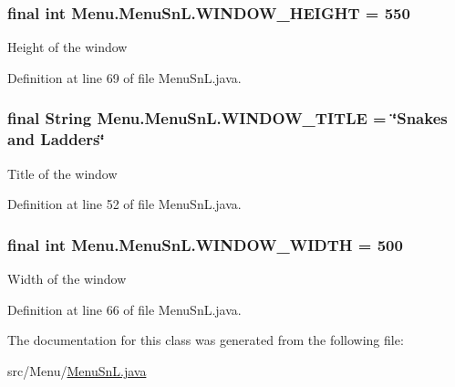 \subsubsection[{W\+I\+N\+D\+O\+W\+\_\+\+H\+E\+I\+G\+H\+T}]{\setlength{\rightskip}{0pt plus 5cm}final int Menu.\+Menu\+Sn\+L.\+W\+I\+N\+D\+O\+W\+\_\+\+H\+E\+I\+G\+H\+T = 550\hspace{0.3cm}{\ttfamily [private]}}\label{class_menu_1_1_menu_sn_l_a32c2e05c64b453df29d8b6df1061a939}
Height of the window 

Definition at line 69 of file Menu\+Sn\+L.\+java.

\hypertarget{class_menu_1_1_menu_sn_l_a62bbb19bbedcdf63b575b4ae1048c343}{}
\subsubsection[{W\+I\+N\+D\+O\+W\+\_\+\+T\+I\+T\+L\+E}]{\setlength{\rightskip}{0pt plus 5cm}final String Menu.\+Menu\+Sn\+L.\+W\+I\+N\+D\+O\+W\+\_\+\+T\+I\+T\+L\+E = \char`\"{}Snakes and Ladders\char`\"{}\hspace{0.3cm}{\ttfamily [private]}}\label{class_menu_1_1_menu_sn_l_a62bbb19bbedcdf63b575b4ae1048c343}
Title of the window 

Definition at line 52 of file Menu\+Sn\+L.\+java.

\hypertarget{class_menu_1_1_menu_sn_l_a2fcacd6fe04ce3a540d0d100ca57b993}{}
\subsubsection[{W\+I\+N\+D\+O\+W\+\_\+\+W\+I\+D\+T\+H}]{\setlength{\rightskip}{0pt plus 5cm}final int Menu.\+Menu\+Sn\+L.\+W\+I\+N\+D\+O\+W\+\_\+\+W\+I\+D\+T\+H = 500\hspace{0.3cm}{\ttfamily [private]}}\label{class_menu_1_1_menu_sn_l_a2fcacd6fe04ce3a540d0d100ca57b993}
Width of the window 

Definition at line 66 of file Menu\+Sn\+L.\+java.



The documentation for this class was generated from the following file\+:\begin{DoxyCompactItemize}
\item 
src/\+Menu/\hyperlink{_menu_sn_l_8java}{Menu\+Sn\+L.\+java}\end{DoxyCompactItemize}
